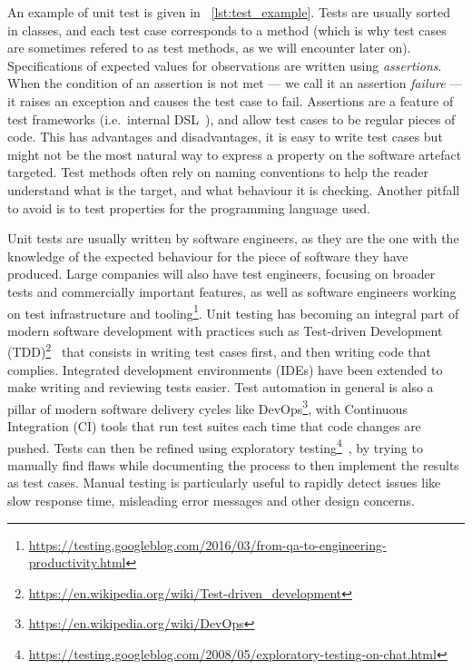 \documentclass[a4paper,11pt]{sdm_internship}
\theoremstyle{definition}
\begin{document}
An example of unit test is given in \listingname~\ref{lst:test_example}.
Tests are usually sorted in classes, and each test case corresponds to a method (which is why test cases are sometimes refered to as test methods, as we will encounter later on).
Specifications of expected values for observations are written using \emph{assertions}.
When the condition of an assertion is not met --- we call it an assertion \emph{failure} --- it raises an exception and causes the test case to fail.
Assertions are a feature of test frameworks (i.e.\ internal DSL~\cite{fowler2010domain}), and allow test cases to be regular pieces of code.
This has advantages and disadvantages, it is easy to write test cases but might not be the most natural way to express a property on the software artefact targeted.
Test methods often rely on naming conventions to help the reader understand what is the target, and what behaviour it is checking.
Another pitfall to avoid is to test properties for the programming language used.

Unit tests are usually written by software engineers, as they are the one with the knowledge of the expected behaviour for the piece of software they have produced.
Large companies will also have test engineers, focusing on broader tests and commercially important features, as well as software engineers working on test infrastructure and tooling\footnote{\url{https://testing.googleblog.com/2016/03/from-qa-to-engineering-productivity.html}}.
Unit testing has becoming an integral part of modern software development with practices such as Test-driven Development (TDD)\footnote{\url{https://en.wikipedia.org/wiki/Test-driven_development}}~\cite{beck2003test} that consists in writing test cases first, and then writing code that complies.
Integrated development environments (IDEs) have been extended to make writing and reviewing tests easier.
Test automation in general is also a pillar of modern software delivery cycles like DevOps\footnote{\url{https://en.wikipedia.org/wiki/DevOps}}, with Continuous Integration (CI) tools that run test suites each time that code changes are pushed.
Tests can then be refined using exploratory testing\footnote{\url{https://testing.googleblog.com/2008/05/exploratory-testing-on-chat.html}}~\cite{kaner2000testing}, by trying to manually find flaws while documenting the process to then implement the results as test cases.
Manual testing is particularly useful to rapidly detect issues like slow response time, misleading error messages and other design concerns.
\end{document}
